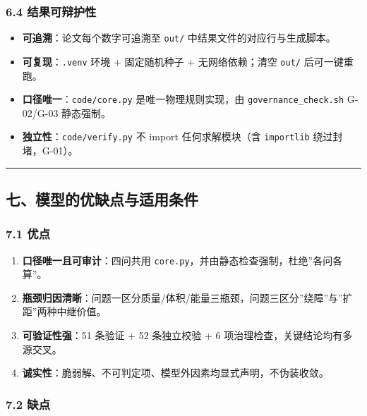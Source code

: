 \documentclass[
  10.5pt,
]{article}
\providecommand{\tightlist}{%
  \setlength{\itemsep}{0pt}\setlength{\parskip}{0pt}}
\begin{document}
\subsubsection{6.4
结果可辩护性}\label{ux7ed3ux679cux53efux8fa9ux62a4ux6027}

\begin{itemize}
\tightlist
\item
  \textbf{可追溯}：论文每个数字可追溯至 \texttt{out/}
  中结果文件的对应行与生成脚本。
\item
  \textbf{可复现}：\texttt{.venv} 环境 + 固定随机种子 + 无网络依赖；清空
  \texttt{out/} 后可一键重跑。
\item
  \textbf{口径唯一}：\texttt{code/core.py} 是唯一物理规则实现，由
  \texttt{governance\_check.sh} G-02/G-03 静态强制。
\item
  \textbf{独立性}：\texttt{code/verify.py} 不 import 任何求解模块（含
  \texttt{importlib} 绕过封堵，G-01）。
\end{itemize}

\begin{center}\rule{0.5\linewidth}{0.5pt}\end{center}

\subsection{七、模型的优缺点与适用条件}\label{ux4e03ux6a21ux578bux7684ux4f18ux7f3aux70b9ux4e0eux9002ux7528ux6761ux4ef6}

\subsubsection{7.1 优点}\label{ux4f18ux70b9}

\begin{enumerate}
\def\labelenumi{\arabic{enumi}.}
\tightlist
\item
  \textbf{口径唯一且可审计}：四问共用
  \texttt{core.py}，并由静态检查强制，杜绝''各问各算''。
\item
  \textbf{瓶颈归因清晰}：问题一区分质量/体积/能量三瓶颈，问题三区分''绕障''与''扩距''两种中继价值。
\item
  \textbf{可验证性强}：51 条验证 + 52 条独立校验 + 6
  项治理检查，关键结论均有多源交叉。
\item
  \textbf{诚实性}：脆弱解、不可判定项、模型外因素均显式声明，不伪装收敛。
\end{enumerate}

\subsubsection{7.2 缺点}\label{ux7f3aux70b9}
\end{document}
